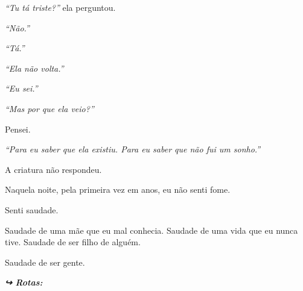 \noindent \textit{\textquotedblleft{}Tu tá triste?\textquotedblright{}} ela perguntou.

\noindent \textit{\textquotedblleft{}Não.\textquotedblright{}}

\noindent \textit{\textquotedblleft{}Tá.\textquotedblright{}}

\noindent \textit{\textquotedblleft{}Ela não volta.\textquotedblright{}}

\noindent \textit{\textquotedblleft{}Eu sei.\textquotedblright{}}

\noindent \textit{\textquotedblleft{}Mas por que ela veio?\textquotedblright{}}

\noindent Pensei.

\noindent \textit{\textquotedblleft{}Para eu saber que ela existiu. Para eu saber que não fui um sonho.\textquotedblright{}}

\noindent A criatura não respondeu.

\noindent Naquela noite, pela primeira vez em anos, eu não senti fome.

\noindent Senti saudade.

\noindent Saudade de uma mãe que eu mal conhecia.
Saudade de uma vida que eu nunca tive.
Saudade de ser filho de alguém.

\noindent Saudade de ser gente.

\vspace{0.5em}
\noindent\textit{\textbf{↪ Rotas:}  \rotasep {}}